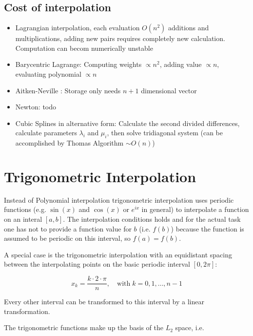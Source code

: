 \documentclass[
    a4paper,
    11pt
]{article}
\begin{document}
\subsection{Cost of interpolation}

\begin{itemize}
    \item Lagrangian interpolation, each evaluation $O(n^2)$ additions and
        multiplications, adding new pairs requires completely new calculation.
        Computation can becom numerically unstable
    \item Barycentric Lagrange: Computing weights $\propto n^2$, adding value
        $\propto n$, evaluating polynomial $\propto n$
    \item Aitken-Neville : Storage only needs $n+1$ dimensional vector
    \item Newton: todo
    \item Cubic Splines in alternative form: Calculate the second divided
        differences, calculate parameters $\lambda_i$ and $\mu_i$, then solve
        tridiagonal system (can be accomplished by Thomas Algorithm $\sim O(n)$)
\end{itemize}


\section{Trigonometric Interpolation}

Instead of Polynomial interpolation trigonometric interpolation uses periodic
functions (e.g. $\sin(x)$ and $\cos(x)$ or $e^{ix}$ in general) to interpolate a
function on an interal $[a, b]$. The interpolation conditions holds and for the
actual task one has not to provide a function value for $b$ (i.e. $f(b)$)
because the function is assumed to be periodic on this interval, so $f(a) =
f(b)$.

A special case is the trigonometric interpolation with an equidistant spacing
between the interpolating points on the basic periodic interval $[0, 2\pi]$:

\begin{equation}
    x_k = \frac{k\cdot 2 \cdot \pi}{n}, \quad \text{with} \; k=0, 1, \dots, n-1
\end{equation}

Every other interval can be transformed to this interval by a linear
transformation.

The trigonometric functions make up the basis of the $L_2$ space, i.e.
\end{document}
